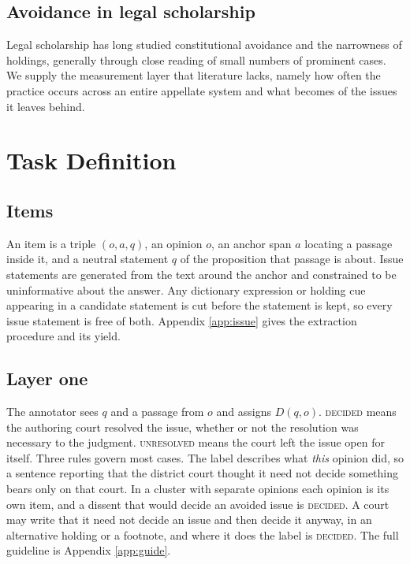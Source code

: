 \documentclass[11pt]{article}
\begin{document}
\subsection{Avoidance in legal scholarship} Legal scholarship has long studied
constitutional avoidance and the narrowness of holdings, generally through close
reading of small numbers of prominent cases. We supply the measurement layer that
literature lacks, namely how often the practice occurs across an entire appellate
system and what becomes of the issues it leaves behind.

\section{Task Definition}
\label{sec:task}

\subsection{Items} An item is a triple $(o, a, q)$, an opinion $o$, an anchor
span $a$ locating a passage inside it, and a neutral statement $q$ of the
proposition that passage is about. Issue statements are generated from the text
around the anchor and constrained to be uninformative about the answer. Any
dictionary expression or holding cue appearing in a candidate statement is cut
before the statement is kept, so every issue statement is free of both. Appendix
\ref{app:issue} gives the extraction procedure and its yield.

\subsection{Layer one} The annotator sees $q$ and a passage from $o$ and assigns
$D(q,o)$. \textsc{decided} means the authoring court resolved the issue, whether
or not the resolution was necessary to the judgment. \textsc{unresolved} means
the court left the issue open for itself. Three rules govern most cases. The
label describes what \emph{this} opinion did, so a sentence reporting that the
district court thought it need not decide something bears only on that court. In
a cluster with separate opinions each opinion is its own item, and a dissent that
would decide an avoided issue is \textsc{decided}. A court may write that it need
not decide an issue and then decide it anyway, in an alternative holding or a
footnote, and where it does the label is \textsc{decided}. The full guideline is
Appendix \ref{app:guide}.
\end{document}
